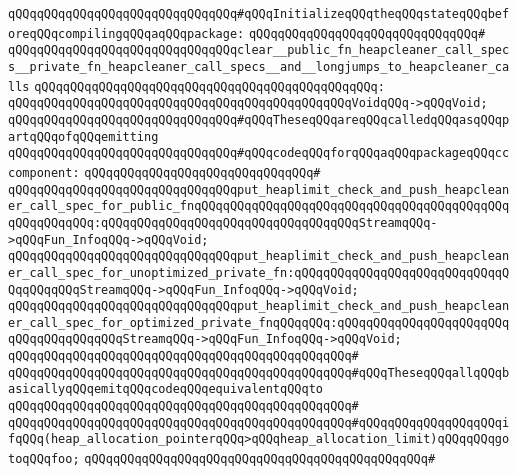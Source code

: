 \newline
\newline
\verb|qQQqqQQqqQQqqQQqqQQqqQQqqQQqqQQq#qQQqInitializeqQQqtheqQQqstateqQQqbeforeqQQqcompilingqQQqaqQQqpackage:|\newline
\verb|qQQqqQQqqQQqqQQqqQQqqQQqqQQqqQQq#|\newline
\verb|qQQqqQQqqQQqqQQqqQQqqQQqqQQqqQQqclear__public_fn_heapcleaner_call_specs__private_fn_heapcleaner_call_specs__and__longjumps_to_heapcleaner_calls|\newline
\verb|qQQqqQQqqQQqqQQqqQQqqQQqqQQqqQQqqQQqqQQqqQQqqQQq:|\newline
\verb|qQQqqQQqqQQqqQQqqQQqqQQqqQQqqQQqqQQqqQQqqQQqqQQqVoidqQQq->qQQqVoid;|\newline
\newline
\verb|qQQqqQQqqQQqqQQqqQQqqQQqqQQqqQQq#qQQqTheseqQQqareqQQqcalledqQQqasqQQqpartqQQqofqQQqemitting|\newline
\verb|qQQqqQQqqQQqqQQqqQQqqQQqqQQqqQQq#qQQqcodeqQQqforqQQqaqQQqpackageqQQqcccomponent:|\newline
\verb|qQQqqQQqqQQqqQQqqQQqqQQqqQQqqQQq#|\newline
\verb|qQQqqQQqqQQqqQQqqQQqqQQqqQQqqQQqput_heaplimit_check_and_push_heapcleaner_call_spec_for_public_fnqQQqqQQqqQQqqQQqqQQqqQQqqQQqqQQqqQQqqQQqqQQqqQQqqQQqqQQq:qQQqqQQqqQQqqQQqqQQqqQQqqQQqqQQqqQQqStreamqQQq->qQQqFun_InfoqQQq->qQQqVoid;|\newline
\verb|qQQqqQQqqQQqqQQqqQQqqQQqqQQqqQQqput_heaplimit_check_and_push_heapcleaner_call_spec_for_unoptimized_private_fn:qQQqqQQqqQQqqQQqqQQqqQQqqQQqqQQqqQQqqQQqStreamqQQq->qQQqFun_InfoqQQq->qQQqVoid;|\newline
\verb|qQQqqQQqqQQqqQQqqQQqqQQqqQQqqQQqput_heaplimit_check_and_push_heapcleaner_call_spec_for_optimized_private_fnqQQqqQQq:qQQqqQQqqQQqqQQqqQQqqQQqqQQqqQQqqQQqqQQqStreamqQQq->qQQqFun_InfoqQQq->qQQqVoid;|\newline
\verb|qQQqqQQqqQQqqQQqqQQqqQQqqQQqqQQqqQQqqQQqqQQqqQQq#|\newline
\verb|qQQqqQQqqQQqqQQqqQQqqQQqqQQqqQQqqQQqqQQqqQQqqQQq#qQQqTheseqQQqallqQQqbasicallyqQQqemitqQQqcodeqQQqequivalentqQQqto|\newline
\verb|qQQqqQQqqQQqqQQqqQQqqQQqqQQqqQQqqQQqqQQqqQQqqQQq#|\newline
\verb|qQQqqQQqqQQqqQQqqQQqqQQqqQQqqQQqqQQqqQQqqQQqqQQq#qQQqqQQqqQQqqQQqqQQqifqQQq(heap_allocation_pointerqQQq>qQQqheap_allocation_limit)qQQqqQQqgotoqQQqfoo;|\newline
\verb|qQQqqQQqqQQqqQQqqQQqqQQqqQQqqQQqqQQqqQQqqQQqqQQq#|\newline
